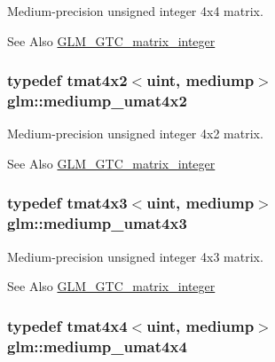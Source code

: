 Medium-\/precision unsigned integer 4x4 matrix. \begin{DoxySeeAlso}{See Also}
\hyperlink{group__gtc__matrix__integer}{G\-L\-M\-\_\-\-G\-T\-C\-\_\-matrix\-\_\-integer} 
\end{DoxySeeAlso}
\hypertarget{group__gtc__matrix__integer_ga9dd5ce011ca43d90cf1b94084c7e90ac}{
\subsubsection[{mediump\-\_\-umat4x2}]{\setlength{\rightskip}{0pt plus 5cm}typedef tmat4x2$<$uint, mediump$>$ {\bf glm\-::mediump\-\_\-umat4x2}}}\label{group__gtc__matrix__integer_ga9dd5ce011ca43d90cf1b94084c7e90ac}
Medium-\/precision unsigned integer 4x2 matrix. \begin{DoxySeeAlso}{See Also}
\hyperlink{group__gtc__matrix__integer}{G\-L\-M\-\_\-\-G\-T\-C\-\_\-matrix\-\_\-integer} 
\end{DoxySeeAlso}
\hypertarget{group__gtc__matrix__integer_gac91ed5aa76fe160d5ab5d31e2b94d95b}{
\subsubsection[{mediump\-\_\-umat4x3}]{\setlength{\rightskip}{0pt plus 5cm}typedef tmat4x3$<$uint, mediump$>$ {\bf glm\-::mediump\-\_\-umat4x3}}}\label{group__gtc__matrix__integer_gac91ed5aa76fe160d5ab5d31e2b94d95b}
Medium-\/precision unsigned integer 4x3 matrix. \begin{DoxySeeAlso}{See Also}
\hyperlink{group__gtc__matrix__integer}{G\-L\-M\-\_\-\-G\-T\-C\-\_\-matrix\-\_\-integer} 
\end{DoxySeeAlso}
\hypertarget{group__gtc__matrix__integer_ga7141a9d9f1c26521e397be34d19c1b8f}{
\subsubsection[{mediump\-\_\-umat4x4}]{\setlength{\rightskip}{0pt plus 5cm}typedef tmat4x4$<$uint, mediump$>$ {\bf glm\-::mediump\-\_\-umat4x4}}}\label{group__gtc__matrix__integer_ga7141a9d9f1c26521e397be34d19c1b8f}
